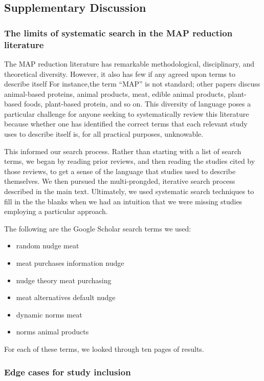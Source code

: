 \documentclass[sn-nature,referee,pdflatex]{sn-jnl}
\providecommand{\tightlist}{%
  \setlength{\itemsep}{0pt}\setlength{\parskip}{0pt}}
\begin{document}
\subsection{Supplementary Discussion}\label{sec5.4}

\subsubsection{The limits of systematic search in the MAP reduction
literature}\label{sec5.4.1}

The MAP reduction literature has remarkable methodological,
disciplinary, and theoretical diversity. However, it also has few if any
agreed upon terms to describe itself For instance,the term ``MAP'' is
not standard; other papers discuss animal-based proteins, animal
products, meat, edible animal products, plant-based foods, plant-based
protein, and so on. This diversity of language poses a particular
challenge for anyone seeking to systematically review this literature
because whether one has identified the correct terms that each relevant
study uses to describe itself is, for all practical purposes,
unknowable.

This informed our search process. Rather than starting with a list of
search terms, we began by reading prior reviews, and then reading the
studies cited by those reviews, to get a sense of the language that
studies used to describe themselves. We then pursued the multi-prongded,
iterative search process described in the main text. Ultimately, we used
systematic search techniques to fill in the the blanks when we had an
intuition that we were missing studies employing a particular approach.

The following are the Google Scholar search terms we used:

\begin{itemize}
\tightlist
\item
  random nudge meat
\item
  meat purchases information nudge
\item
  nudge theory meat purchasing
\item
  meat alternatives default nudge
\item
  dynamic norms meat
\item
  norms animal products
\end{itemize}

For each of these terms, we looked through ten pages of results.

\subsubsection{Edge cases for study inclusion}\label{sec5.4.2}
\end{document}

